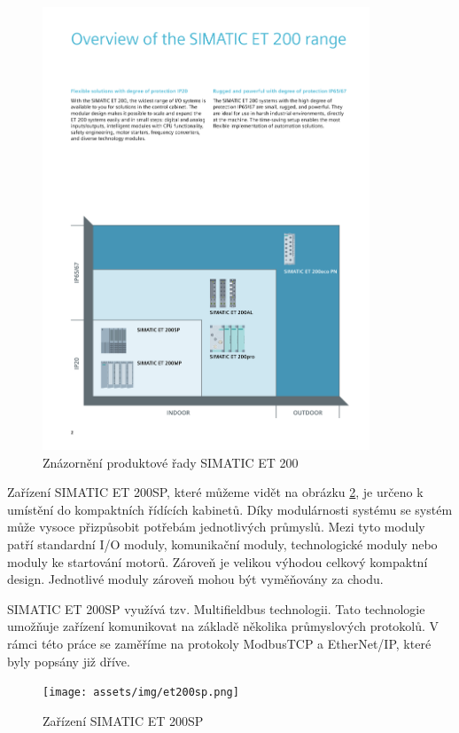 \begin{figure}[htbp]
    \centering 
    \includegraphics[width=0.87\textwidth]{assets/img/et200.pdf}
    \caption{Znázornění produktové řady SIMATIC ET 200}
    \label{fig:et200}
\end{figure}

Zařízení SIMATIC ET 200SP, které můžeme vidět na obrázku \ref{fig:et200sp}, je určeno k umístění do kompaktních řídících kabinetů. Díky modulárnosti systému se systém může vysoce přizpůsobit potřebám jednotlivých průmyslů. Mezi tyto moduly patří standardní I/O moduly, komunikační moduly, technologické moduly nebo moduly ke startování motorů. Zároveň je velikou výhodou celkový kompaktní design. Jednotlivé moduly zároveň mohou být vyměňovány za chodu. \cite{et200sp}

SIMATIC ET 200SP využívá tzv. Multifieldbus technologii. Tato technologie umožňuje zařízení komunikovat na základě několika průmyslových protokolů. V rámci této práce se zaměříme na protokoly ModbusTCP a EtherNet/IP, které byly popsány již dříve.

\begin{figure}[htbp]
    \centering 
    \texttt{[image: assets/img/et200sp.png]}
    \caption{Zařízení SIMATIC ET 200SP}
    \label{fig:et200sp}
\end{figure}